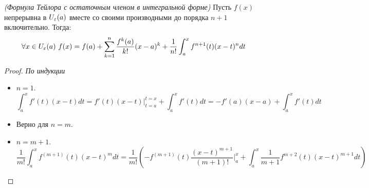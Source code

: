 \begin{theorem} \textit{(Формула Тейлора с остаточным членом в интегральной форме)}
	Пусть $f(x)$ непрерывна в $U_\varepsilon(a)$ вместе со своими производными до порядка $n + 1$ включительно.
	Тогда:
	\[
		\forall x \in U_\varepsilon(a)\ f(x) = f(a) + \sum\limits_{k = 1}^n\frac{f^k(a)}{k!}(x - a)^k + \frac{1}{n!}\int_a^xf^{n + 1}(t)(x - t)^ndt
	\]
\end{theorem}

\begin{proof} \textit{По индукции}
	\begin{itemize}
		\item $n = 1$.
		\[
			\int_a^xf'(t)(x - t)dt = f'(t)(x - t) \Biggr |_{t = a}^{t = x} + \int_a^xf'(t)dt = - f'(a)(x - a) + \int_a^xf'(t)dt
		\]
		\item Верно для $n = m$.
		\item $n = m + 1$.
		\[
			\frac{1}{m!}\int_a^xf^{(m + 1)}(t)(x - t)^mdt = \frac{1}{m!}(-f^{(m + 1)}(t)\frac{(x - t)^{m + 1}}{(m + 1)!}\Biggr |_a^x + \int_a^x\frac{1}{m + 1}f^{m + 2}(t)(x - t)^{m + 1}dt)
		\]
		
	\end{itemize}
	
\end{proof}